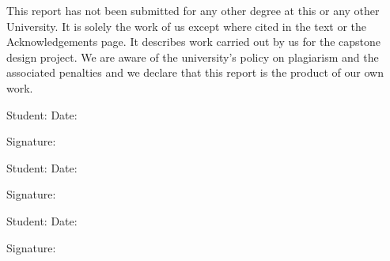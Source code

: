 \documentclass[../main.tex]{subfiles}
\begin{document}
This report has not been submitted for any other degree at this or any other University. 
It is solely the work of us except where cited in the text or the Acknowledgements page. 
It describes work carried out by us for the capstone design project. 
We are aware of the university’s policy on plagiarism and the associated penalties and 
we declare that this report is the product of our own work.

\vspace{2\baselineskip}

\noindent
Student: \hfill Date:\hphantom{XX XXXX XXXX}

\medskip\noindent
Signature:

\vspace{2\baselineskip}

\noindent
Student: \hfill Date:\hphantom{XX XXXX XXXX}

\medskip\noindent
Signature:

\vspace{2\baselineskip}

\noindent
Student: \hfill Date:\hphantom{XX XXXX XXXX}

\medskip\noindent
Signature:
\end{document}
